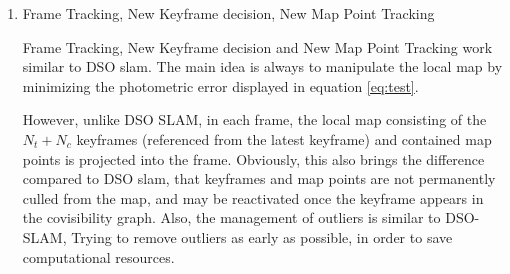 \begin{enumerate}
	\item{Frame Tracking, New Keyframe decision, New Map Point Tracking}
	
	Frame Tracking, New Keyframe decision and New Map Point Tracking work similar to DSO slam. The main idea is always to manipulate the local map 
	by minimizing the photometric error displayed in equation \ref{eq:test}. 

	However, unlike DSO SLAM, in each frame, the local map 
	consisting of the $N_t + N_c$ keyframes (referenced from the latest keyframe) and contained map points is projected into the frame. 
	Obviously, this also brings the difference compared to DSO slam, that keyframes and map points are not permanently culled from the 
	map, and may be reactivated once the keyframe appears in the covisibility graph. Also, the management of outliers is similar to DSO-SLAM, 
	Trying to remove outliers as early as possible, in order to save computational resources. 
	\end{enumerate}
 